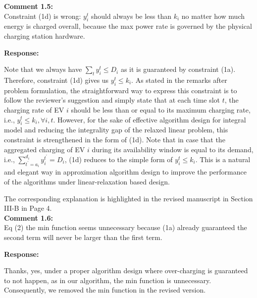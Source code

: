 \documentclass[11pt]{article}
\newcommand{\rev}[1]{{\color{black}#1}}%
\newcommand{\comm}[1]{\textbf{\color{red}(Mohammad says: #1)}}%
\newcommand{\rev}[1]{#1}
\newcommand{\bahram}[1]{\todo[inline,color=orange!40]{{\it Bahram:~}#1}}
\begin{document}

  
\vspace{5mm}
{
{\color{blue}\noindent\textbf{Comment 1.5:}\\
Constraint (1d) is wrong: $y_i^t$ should always be less than $k_i$ no matter how much energy is charged overall, because the max power rate is governed by the physical charging station hardware.

}}

\vspace{5mm}
\noindent\textbf{Response:}

Note that \rev{we always have $\sum_t y_i^{t}\leq D_i$ as it is guaranteed by constraint  (1a). Therefore, constraint (1d) gives us $y_i^{t}\leq k_i$}. As stated in the remarks after problem formulation, the straightforward way to express this constraint is to follow the reviewer's suggestion and simply state that at each time slot $t$, the charging rate of EV $i$ should be less than or equal to its maximum charging rate, i.e., $y_i^t\leq k_i, \forall i,t$. 
However, for the sake of effective algorithm design for integral model and reducing the integrality gap of the relaxed linear problem, this constraint is strengthened in the form of (1d). 
Note that in case that the aggregated charging of EV $i$ during its availability window is equal to its demand, i.e., $\sum_{t^\prime=a_i}^{d_i} y_i^{t^\prime}= D_i$, (1d) reduces to the simple form of $y_i^t\leq k_i$.  
This is a natural and elegant way in approximation algorithm design to improve the performance of the algorithms under linear-relaxation based design. 

The corresponding explanation is highlighted in the revised manuscript in Section III-B in Page 4.
\\

\vspace{5mm}
{
{\color{blue}\noindent\textbf{Comment 1.6:}\\
Eq (2) the min function seems unnecessary because (1a) already guaranteed the second term will never be larger than the first term.
}}

\vspace{5mm}
\noindent\textbf{Response:}

Thanks, yes, under a proper algorithm design where over-charging is guaranteed to not happen, as in our algorithm, the min function is unnecessary. Consequently, we removed the min function in the revised version. 
\end{document}
